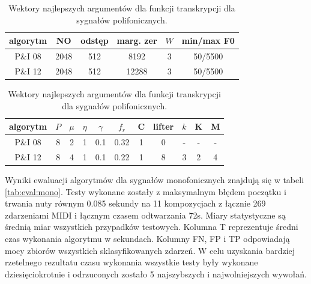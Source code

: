 \documentclass[12pt,a4paper,twoside]{mwart}
\begin{document}
\begin{table}[H]
  \begin{center}
    \begin{tabular}{ |c|c|c|c|c|c| } 
      \hline
      algorytm & NO & odstęp & marg. zer & $W$ & min/max F0  \\
      \hline
      P\&I 08 & 2048 & 512 & 8192 & 3 & 50/5500 \\
      P\&I 12 & 2048 & 512 & 12288 & 3 & 50/5500 \\
      \hline
    \end{tabular}
  \end{center}


  \begin{center}
    \begin{tabular}{ |c|c|c|c|c|c|c|c|c|c|c| } 
      \hline
      algorytm & $P$ & \textit{$\mu$} & $\eta$  & $\gamma$ & $f_r$ & C & lifter & $k$ & K & M\\
      \hline
      P\&I 08 & 8 & 2 & 1  & 0.1& 0.32 & 1 & 0 & - & - & -\\
      P\&I 12 & 8 & 4 & 1  & 0.1& 0.22 & 1 & 8 & 3 & 2 & 4\\
      \hline
      \end{tabular}
  \end{center}
  \caption{Wektory najlepszych argumentów dla funkcji transkrypcji dla sygnałów polifonicznych.}
  \label{tab:bestArgPoli}
\end{table}

Wyniki ewaluacji algorytmów dla sygnałów monofonicznych znajdują się w tabeli \ref{tab:eval:mono}. Testy wykonane zostały z maksymalnym błędem początku i trwania nuty równym 0.085 sekundy na 11 kompozycjach z łącznie 269 zdarzeniami MIDI i łącznym czasem odtwarzania 72s. Miary statystyczne są średnią miar wszystkich przypadków testowych. Kolumna T reprezentuje średni czas wykonania algorytmu w sekundach. Kolumny FN, FP i TP odpowiadają mocy zbiorów wszystkich sklasyfikowanych zdarzeń. W celu uzyskania bardziej rzetelnego rezultatu czasu wykonania wszystkie testy były wykonane dziesięciokrotnie i odrzuconych zostało 5 najszybszych i najwolniejszych wywołań.
\end{document}
